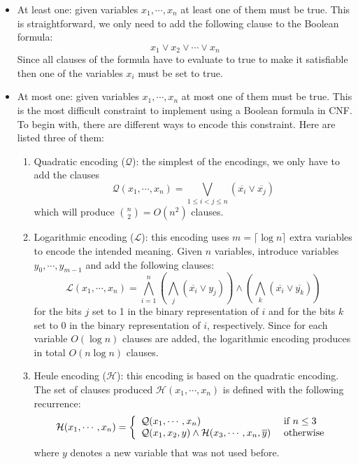 \begin{itemize}
	\item At least one: given variables $x_1,\cdots,x_n$ at least
	one of them must be true. This is straightforward, we only need
	to add the following clause to the Boolean formula:
	\begin{equation}
	\label{eq:cnf:at-least-one}
	x_1 \vee x_2 \vee \cdots \vee x_n
	\end{equation}
	Since all clauses of the formula have to evaluate to true to make
	it satisfiable then one of the variables $x_i$ must be set to true.
	
	\item At most one: given variables $x_1,\cdots,x_n$ at most
	one of them must be true. This is the most difficult constraint
	to implement using a Boolean formula in CNF. To begin with, there
	are different ways to encode this constraint. Here are listed
	three of them:
	\begin{enumerate}
		\item Quadratic encoding ($\mathcal{Q}$): the simplest of the
		encodings, we only have to add the clauses
		\begin{equation}
		\label{eq:cnf:at-most-one:quad}
		\mathcal{Q}(x_1,\cdots, x_n) =
		\bigvee_{1 \le i < j \le n} (\overline{x_i}\vee\overline{x_j})
		\end{equation}
		which will produce $\binom{n}{2} = O(n^2)$ clauses.
		
		\item Logarithmic encoding ($\mathcal{L}$): this encoding uses
		$m = \lceil \log{n} \rceil$ extra variables to encode the
		intended meaning. Given $n$ variables, introduce variables
		$y_0,\cdots,y_{m-1}$ and add the following clauses:
		\begin{equation}
		\label{eq:cnf:at-most-one:log}
		\mathcal{L}(x_1,\cdots, x_n) = 
		\bigwedge_{i=1}^n
		\left(\bigwedge_{j} (\overline{x_i} \vee y_j) \right)
		\wedge
		\left(\bigwedge_{k} (\overline{x_i} \vee \overline{y_k}) \right)
		\end{equation}
		for the bits $j$ set to 1 in the binary representation of $i$ and
		for the bits $k$ set to 0 in the binary representation of $i$, respectively.
		Since for each variable $O(\log{n})$ clauses are added, the logarithmic
		encoding produces in total $O(n\log{n})$ clauses.
		
		\item Heule encoding ($\mathcal{H}$): this encoding is based on
		the quadratic encoding. The set of clauses produced $\mathcal{H}(x_1,\cdots, x_n)$
		is defined with the following recurrence:
		\begin{equation}
		\label{eq:cnf:at-most-one:heule}
		\mathcal{H}(x_1,\cdots, x_n) =
		\left\{
		\begin{array}{l l}
		\mathcal{Q}(x_1,\cdots, x_n) & \text{ if } n \le 3 \\
		\mathcal{Q}(x_1,x_2,y) \wedge \mathcal{H}(x_3,\cdots, x_n, \overline{y}) & \text{ otherwise}
		\end{array}
		\right.
		\end{equation}
		where $y$ denotes a new variable that was not used before.
	\end{enumerate}
\end{itemize}

